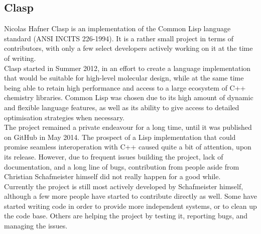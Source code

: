 \subsection{Clasp}{Nicolas Hafner}
Clasp\cite{clasp-github} is an implementation of the Common Lisp language standard (ANSI INCITS 226-1994). It is a rather small project in terms of contributors, with only a few select developers actively working on it at the time of writing. \\
Clasp started in Summer 2012\cite{clasp-timeline}, in an effort to create a language implementation that would be suitable for high-level molecular design, while at the same time being able to retain high performance and access to a large ecosystem of C++ chemistry libraries\cite{clasp-cando}. Common Lisp was chosen due to its high amount of dynamic and flexible language features, as well as its ability to give access to detailed optimisation strategies when necessary\cite{clasp-talk}. \\

The project remained a private endeavour for a long time, until it was published on GitHub in May 2014\cite{clasp-github}. The prospect of a Lisp implementation that could promise seamless interoperation with C++ caused quite a bit of attention, upon its release. However, due to frequent issues building the project, lack of documentation, and a long line of bugs, contribution from people aside from Christian Schafmeister himself did not really happen for a good while. \\

Currently the project is still most actively developed by Schafmeister himself, although a few more people have started to contribute directly as well. Some have started writing code in order to provide more independent systems, or to clean up the code base. Others are helping the project by testing it, reporting bugs, and managing the issues. \\

